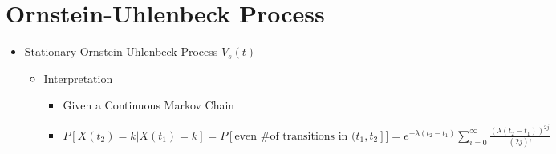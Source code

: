 \documentclass[a4paper]{article}
\begin{document}
\section{Ornstein-Uhlenbeck Process}
\begin{itemize}
    \item Stationary Ornstein-Uhlenbeck Process $V_s(t)$
        \begin{itemize}
            \item Interpretation
                \begin{itemize}
                    \item Given a Continuous Markov Chain
                    \item $P[X(t_2) = k | X(t_1) = k] = P[\text{even \# of transitions in } (t_1, t_2]] = e^{-\lambda (t_2 - t_1)} \sum_{i = 0}^\infty \frac{(\lambda (t_2 - t_1))^{2j}}{(2j)!}$


\end{itemize}
\end{itemize}
\end{itemize}
\end{document}
